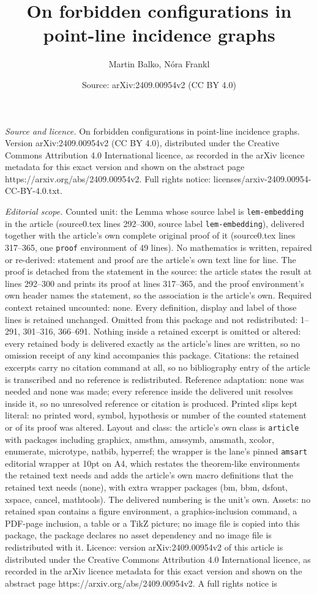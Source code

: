 \documentclass[10pt,a4paper]{amsart}
\title[On forbidden configurations in point-line incidence graphs]{On forbidden configurations in point-line incidence graphs}
\author{Martin Balko, N\'ora Frankl}
\date{Source: arXiv:2409.00954v2 (CC BY 4.0)}
\begin{document}
\maketitle

\noindent\emph{Source and licence.} On forbidden configurations in point-line incidence graphs. Version arXiv:2409.00954v2 (CC BY 4.0), distributed under the Creative Commons Attribution 4.0 International licence, as recorded in the arXiv licence metadata for this exact version and shown on the abstract page https://arxiv.org/abs/2409.00954v2. Full rights notice: licenses/arxiv-2409.00954-CC-BY-4.0.txt.\par\smallskip

\noindent\textit{Editorial scope.} Counted unit: the Lemma whose source label is \texttt{lem-embedding} in the article (source0.tex lines 292--300, source label \texttt{lem-embedding}), delivered together with the article's own complete original proof of it (source0.tex lines 317--365, one \texttt{proof} environment of 49 lines). No mathematics is written, repaired or re-derived: statement and proof are the article's own text line for line. The proof is detached from the statement in the source: the article states the result at lines 292--300 and prints its proof at lines 317--365, and the proof environment's own header names the statement, so the association is the article's own. Required context retained uncounted: none. Every definition, display and label of those lines is retained unchanged. Omitted from this package and not redistributed: 1--291, 301--316, 366--691. Nothing inside a retained excerpt is omitted or altered: every retained body is delivered exactly as the article's lines are written, so no omission receipt of any kind accompanies this package. Citations: the retained excerpts carry no citation command at all, so no bibliography entry of the article is transcribed and no reference is redistributed. Reference adaptation: none was needed and none was made; every reference inside the delivered unit resolves inside it, so no unresolved reference or citation is produced. Printed slips kept literal: no printed word, symbol, hypothesis or number of the counted statement or of its proof was altered. Layout and class: the article's own class is \texttt{article} with packages including graphicx, amsthm, amssymb, amsmath, xcolor, enumerate, microtype, natbib, hyperref; the wrapper is the lane's pinned \texttt{amsart} editorial wrapper at 10pt on A4, which restates the theorem-like environments the retained text needs and adds the article's own macro definitions that the retained text needs (none), with extra wrapper packages (bm, bbm, dsfont, xspace, cancel, mathtools). The delivered numbering is the unit's own. Assets: no retained span contains a figure environment, a graphics-inclusion command, a PDF-page inclusion, a table or a TikZ picture; no image file is copied into this package, the package declares no asset dependency and no image file is redistributed with it. Licence: version arXiv:2409.00954v2 of this article is distributed under the Creative Commons Attribution 4.0 International licence, as recorded in the arXiv licence metadata for this exact version and shown on the abstract page https://arxiv.org/abs/2409.00954v2. A full rights notice is 
\end{document}
